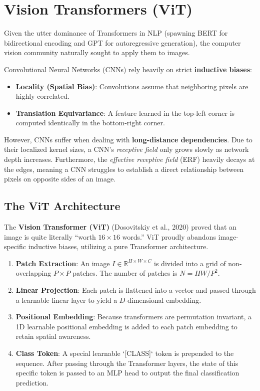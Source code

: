 \section{Vision Transformers (ViT)}
\label{sec:vit}

Given the utter dominance of Transformers in NLP (spawning BERT for bidirectional encoding and GPT for autoregressive generation), the computer vision community naturally sought to apply them to images. 

Convolutional Neural Networks (CNNs) rely heavily on strict \textbf{inductive biases}:
\begin{itemize}
    \item \textbf{Locality (Spatial Bias)}: Convolutions assume that neighboring pixels are highly correlated.
    \item \textbf{Translation Equivariance}: A feature learned in the top-left corner is computed identically in the bottom-right corner.
\end{itemize}

However, CNNs suffer when dealing with \textbf{long-distance dependencies}. Due to their localized kernel sizes, a CNN's \textit{receptive field} only grows slowly as network depth increases. Furthermore, the \textit{effective receptive field} (ERF) heavily decays at the edges, meaning a CNN struggles to establish a direct relationship between pixels on opposite sides of an image.

\subsection{The ViT Architecture}
The \textbf{Vision Transformer (ViT)} (Dosovitskiy et al., 2020) proved that an image is quite literally ``worth $16 \times 16$ words.'' ViT proudly abandons image-specific inductive biases, utilizing a pure Transformer architecture.

\begin{enumerate}
    \item \textbf{Patch Extraction}: An image $I \in \mathbb{R}^{H \times W \times C}$ is divided into a grid of non-overlapping $P \times P$ patches. The number of patches is $N = HW / P^2$.
    \item \textbf{Linear Projection}: Each patch is flattened into a vector and passed through a learnable linear layer to yield a $D$-dimensional embedding.
    \item \textbf{Positional Embedding}: Because transformers are permutation invariant, a 1D learnable positional embedding is added to each patch embedding to retain spatial awareness.
    \item \textbf{Class Token}: A special learnable `[CLASS]` token is prepended to the sequence. After passing through the Transformer layers, the state of this specific token is passed to an MLP head to output the final classification prediction.
\end{enumerate}

